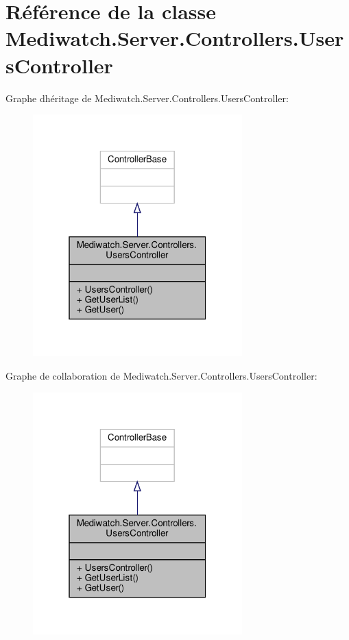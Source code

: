 \hypertarget{class_mediwatch_1_1_server_1_1_controllers_1_1_users_controller}{}\section{Référence de la classe Mediwatch.\+Server.\+Controllers.\+Users\+Controller}
\label{class_mediwatch_1_1_server_1_1_controllers_1_1_users_controller}


Graphe d\textquotesingle{}héritage de Mediwatch.\+Server.\+Controllers.\+Users\+Controller\+:\nopagebreak
\begin{figure}[H]
\begin{center}
\leavevmode
\includegraphics[width=229pt]{class_mediwatch_1_1_server_1_1_controllers_1_1_users_controller__inherit__graph}
\end{center}
\end{figure}


Graphe de collaboration de Mediwatch.\+Server.\+Controllers.\+Users\+Controller\+:\nopagebreak
\begin{figure}[H]
\begin{center}
\leavevmode
\includegraphics[width=229pt]{class_mediwatch_1_1_server_1_1_controllers_1_1_users_controller__coll__graph}
\end{center}
\end{figure}
